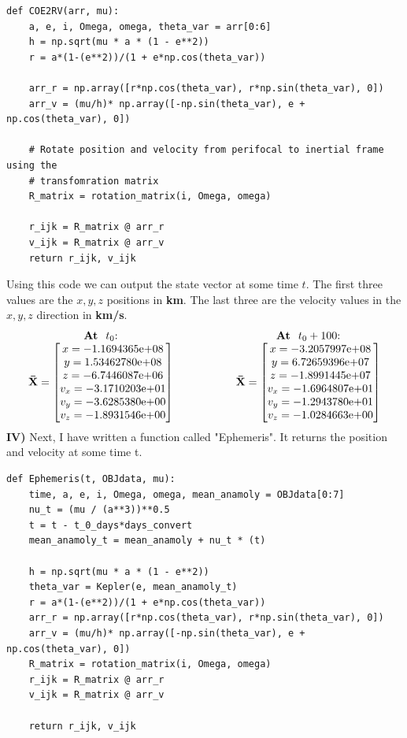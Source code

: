 \documentclass[a4paper, 12pt]{article}  %
\begin{document}
\begin{lstlisting}   
def COE2RV(arr, mu):
    a, e, i, Omega, omega, theta_var = arr[0:6]
    h = np.sqrt(mu * a * (1 - e**2))
    r = a*(1-(e**2))/(1 + e*np.cos(theta_var))

    arr_r = np.array([r*np.cos(theta_var), r*np.sin(theta_var), 0])
    arr_v = (mu/h)* np.array([-np.sin(theta_var), e + np.cos(theta_var), 0])

    # Rotate position and velocity from perifocal to inertial frame using the 
    # transfomration matrix
    R_matrix = rotation_matrix(i, Omega, omega)

    r_ijk = R_matrix @ arr_r
    v_ijk = R_matrix @ arr_v
    return r_ijk, v_ijk
\end{lstlisting}
Using this code we can output the state vector at some time $t$. The first three values 
are the $x,y,z$ positions in \textbf{km}. The last three are the velocity values in the $x,y,z$ direction 
in \textbf{km/s}.
\[
\begin{tabular}{c@{\hspace{2cm}}c}
\textbf{At } $t_0$: &
\textbf{At } $t_0 + 100$: \\
$\mathbf{\bar{X}} =
\begin{bmatrix}
x = -1.1694365\mathrm{e}{+08} \\
y =  1.53462780\mathrm{e}{+08} \\
z = -6.7446087\mathrm{e}{+06} \\
v_x = -3.1710203\mathrm{e}{+01} \\
v_y = -3.6285380\mathrm{e}{+00} \\
v_z = -1.8931546\mathrm{e}{+00}
\end{bmatrix}$ &
$\mathbf{\bar{X}} =
\begin{bmatrix}
x = -3.2057997\mathrm{e}{+08} \\
y =  6.72659396\mathrm{e}{+07} \\
z = -1.8991445\mathrm{e}{+07} \\
v_x = -1.6964807\mathrm{e}{+01} \\
v_y = -1.2943780\mathrm{e}{+01} \\
v_z = -1.0284663\mathrm{e}{+00}
\end{bmatrix}$
\end{tabular}
\]
\textbf{IV)} Next, I have written a function called "Ephemeris". It returns the position and velocity at some time t.
\begin{lstlisting}
def Ephemeris(t, OBJdata, mu):
    time, a, e, i, Omega, omega, mean_anamoly = OBJdata[0:7]
    nu_t = (mu / (a**3))**0.5
    t = t - t_0_days*days_convert
    mean_anamoly_t = mean_anamoly + nu_t * (t)

    h = np.sqrt(mu * a * (1 - e**2))
    theta_var = Kepler(e, mean_anamoly_t)
    r = a*(1-(e**2))/(1 + e*np.cos(theta_var))
    arr_r = np.array([r*np.cos(theta_var), r*np.sin(theta_var), 0])
    arr_v = (mu/h)* np.array([-np.sin(theta_var), e + np.cos(theta_var), 0])
    R_matrix = rotation_matrix(i, Omega, omega)
    r_ijk = R_matrix @ arr_r
    v_ijk = R_matrix @ arr_v
    
    return r_ijk, v_ijk
\end{lstlisting}
\end{document}
